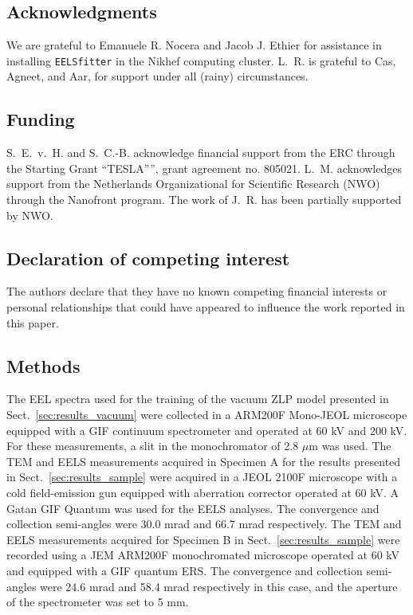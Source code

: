 \subsection*{Acknowledgments}
We are grateful to Emanuele R. Nocera and Jacob J. Ethier for
assistance in installing {\tt EELSfitter} in the Nikhef computing cluster.
%
L.~R. is grateful to Cas, Agneet, and Aar, for support under all 
(rainy) circumstances.


\subsection*{Funding}

S.~E.~v.~H. and S.~C.-B. acknowledge financial support
from the ERC through the Starting Grant ``TESLA”'', grant agreement
no. 805021.
%
L.~M. acknowledges support from the
Netherlands Organizational for Scientific Research (NWO)
through the Nanofront program.
%
The work of J.~R. has been partially supported by NWO.

\subsection*{Declaration of competing interest}

The authors declare that they have no known competing financial interests or personal relationships that could have appeared to influence the work reported in this paper.

\subsection*{Methods}

The EEL spectra used for the training of the vacuum ZLP model presented in
Sect.~\ref{sec:results_vacuum} were collected in a ARM200F Mono-JEOL microscope equipped
with a GIF continuum spectrometer and operated at 60 kV and 200 kV. For these measurements,
a slit in the monochromator of 2.8 $\mu$m was used.
%
The TEM and EELS measurements acquired in Specimen A for the results presented in
Sect.~\ref{sec:results_sample} were acquired in a JEOL 2100F microscope with a cold field-emission
gun equipped with aberration corrector operated at 60 kV. A Gatan GIF Quantum was used for
the EELS analyses. The convergence and collection semi-angles were 30.0 mrad and 66.7 mrad respectively.
%
The TEM and EELS measurements acquired for Specimen B in Sect.~\ref{sec:results_sample}
were recorded using a JEM ARM200F monochromated microscope operated at 60 kV and equipped with
a GIF quantum ERS. The convergence and collection semi-angles were 24.6 mrad and 58.4 mrad respectively
in this case, and the aperture of the spectrometer was set to 5 mm. 
